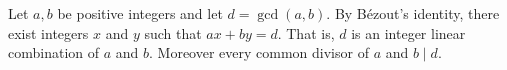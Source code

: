 Let $a, b$ be positive integers and let $d = \gcd(a, b)$.
By Bézout's identity, there exist integers $x$ and $y$ such that $ax + by = d$.
That is, $d$ is an integer linear combination of $a$ and $b$.
Moreover every common divisor of $a$ and $b \mid d$.